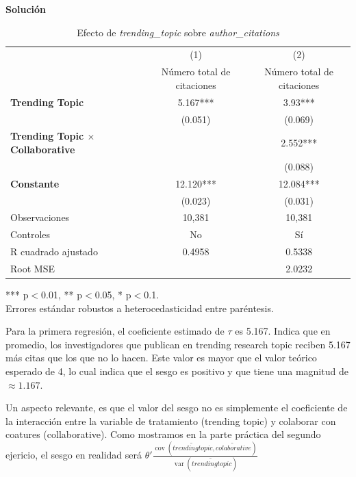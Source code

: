 \documentclass[a4paper, answers, addpoints, 11pt]{exam}
\newenvironment{solucion}{%
  \begin{mdframed}[
    backgroundcolor=blue!5,    %
    linecolor=blue!50,          %
    linewidth=2pt,              %
    leftmargin=10pt,            %
    rightmargin=8pt,           %
    topline=true,              %
    bottomline=true,            %
    roundcorner=10pt,           %
    innerleftmargin=10pt,       %
    innerrightmargin=10pt,      %
    innerbottommargin=10pt,     %
    innertopmargin=10pt         %
  ]%
  \begin{tcolorbox}[colframe=blue!50!black, colback=blue!50, coltitle=white, sharp corners=all, boxrule=1mm, width=\textwidth, halign=left, valign=center, top=0mm, bottom=0mm, left=0mm, right=0mm] \textbf{Solución} \end{tcolorbox} }{\end{mdframed}}
\begin{document}
\begin{itemize}
\begin{itemize}
\begin{solucion}

 \begin{table}[H]
    \centering
    \caption{Efecto de \textit{trending\_topic} sobre \textit{author\_citations}}
    \label{tab:resultados}
    \begin{tabular}{l c c}
        \toprule
        & (1) & (2) \\
        & Número total de citaciones & Número total de citaciones \\
        \midrule
        \textbf{Trending Topic} & 5.167*** & 3.93*** \\
        & (0.051) & (0.069) \\
        \textbf{Trending Topic $\times$ Collaborative} &  & 2.552*** \\
        &  & (0.088) \\
        \textbf{Constante} & 12.120*** & 12.084*** \\
        & (0.023) & (0.031) \\
        \midrule
        Observaciones & 10,381 & 10,381 \\
        Controles & No & Sí \\
        R cuadrado ajustado & 0.4958 & 0.5338 \\
        Root MSE &  & 2.0232 \\
        \bottomrule
    \end{tabular}
    
    \vspace{0.3cm}
    \footnotesize{*** p$<$0.01, ** p$<$0.05, * p$<$0.1. \\
    Errores estándar robustos a heterocedasticidad entre paréntesis.}
\end{table}

Para la primera regresión, el coeficiente estimado de $\tau$ es 5.167. Indica que en promedio, los investigadores que publican en trending research topic reciben 5.167 más citas que los que no lo hacen. Este valor es  mayor que el valor teórico esperado de 4, lo cual indica que el sesgo es positivo y que tiene una magnitud de $\approx 1.167$.

Un aspecto relevante, es que el valor del sesgo no es simplemente el coeficiente de la interacción entre la variable de tratamiento (trending topic) y colaborar con coatures (collaborative). Como mostramos en la parte práctica del segundo ejericio, el sesgo en realidad será $\theta' \frac{\operatorname{cov}(\tilde{trending topic}, \tilde{colaborative})}{\operatorname{var}(\tilde{trending topic})}$
\end{solucion}
    \end{itemize}
 \end{itemize}    
\end{document}

